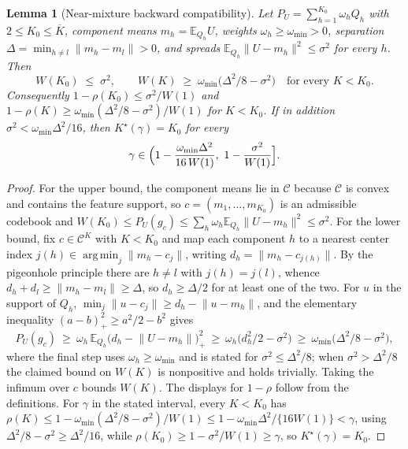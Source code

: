 \documentclass[11pt]{article}
\newtheorem{lemma}{Lemma}
\newcommand{\E}{\mathbb E}
\DeclareMathOperator*{\argmin}{arg\,min}
\newcommand{\calC}{\mathcal C}
\newcommand{\norm}[1]{\lVert #1\rVert}
\begin{document}
\begin{lemma}[Near-mixture backward compatibility]\label{lem:nearmixture}
Let $P_U=\sum_{h=1}^{K_0}\omega_h Q_h$ with $2\le K_0\le\overline K$, component means $m_h=\E_{Q_h}U$, weights $\omega_h\ge\omega_{\min}>0$, separation $\Delta=\min_{h\ne l}\norm{m_h-m_l}>0$, and spreads $\E_{Q_h}\norm{U-m_h}^2\le\sigma^2$ for every $h$. Then
\begin{equation*}
W(K_0)\;\le\;\sigma^2,
\qquad
W(K)\;\ge\;\omega_{\min}\bigl(\Delta^2/8-\sigma^2\bigr)\quad\text{for every }K<K_0 .
\end{equation*}
Consequently $1-\rho(K_0)\le\sigma^2/W(1)$ and $1-\rho(K)\ge\omega_{\min}(\Delta^2/8-\sigma^2)/W(1)$ for $K<K_0$. If in addition $\sigma^2<\omega_{\min}\Delta^2/16$, then $K^\star(\gamma)=K_0$ for every
\begin{equation*}
\gamma\in\Bigl(1-\frac{\omega_{\min}\Delta^2}{16\,W(1)},\ 1-\frac{\sigma^2}{W(1)}\Bigr].
\end{equation*}
\end{lemma}

\begin{proof}
For the upper bound, the component means lie in $\calC$ because $\calC$ is convex and contains the feature support, so $c=(m_1,\dots,m_{K_0})$ is an admissible codebook and $W(K_0)\le P_U(g_c)\le\sum_h\omega_h\E_{Q_h}\norm{U-m_h}^2\le\sigma^2$. For the lower bound, fix $c\in\calC^K$ with $K<K_0$ and map each component $h$ to a nearest center index $j(h)\in\argmin_j\norm{m_h-c_j}$, writing $d_h=\norm{m_h-c_{j(h)}}$. By the pigeonhole principle there are $h\ne l$ with $j(h)=j(l)$, whence $d_h+d_l\ge\norm{m_h-m_l}\ge\Delta$, so $d_h\ge\Delta/2$ for at least one of the two. For $u$ in the support of $Q_h$, $\min_j\norm{u-c_j}\ge d_h-\norm{u-m_h}$, and the elementary inequality $(a-b)_+^2\ge a^2/2-b^2$ gives
\begin{equation*}
P_U(g_c)\ \ge\ \omega_h\,\E_{Q_h}\bigl(d_h-\norm{U-m_h}\bigr)_+^2\ \ge\ \omega_h\bigl(d_h^2/2-\sigma^2\bigr)\ \ge\ \omega_{\min}\bigl(\Delta^2/8-\sigma^2\bigr),
\end{equation*}
where the final step uses $\omega_h\ge\omega_{\min}$ and is stated for $\sigma^2\le\Delta^2/8$; when $\sigma^2>\Delta^2/8$ the claimed bound on $W(K)$ is nonpositive and holds trivially. Taking the infimum over $c$ bounds $W(K)$. The displays for $1-\rho$ follow from the definitions. For $\gamma$ in the stated interval, every $K<K_0$ has $\rho(K)\le1-\omega_{\min}(\Delta^2/8-\sigma^2)/W(1)\le1-\omega_{\min}\Delta^2/\{16W(1)\}<\gamma$, using $\Delta^2/8-\sigma^2\ge\Delta^2/16$, while $\rho(K_0)\ge1-\sigma^2/W(1)\ge\gamma$, so $K^\star(\gamma)=K_0$.
\end{proof}
\end{document}
